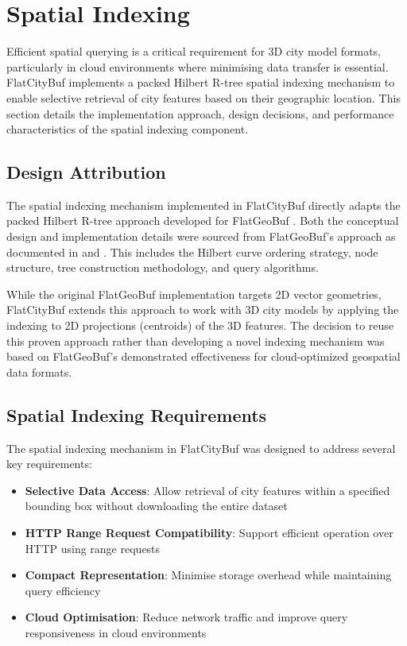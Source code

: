 
\section{Spatial Indexing}
\label{methodology:spatial_index}

Efficient spatial querying is a critical requirement for 3D city model formats, particularly in cloud environments where minimising data transfer is essential. FlatCityBuf implements a packed Hilbert R-tree spatial indexing mechanism \citep{Roussopoulos_Leifker_1985} to enable selective retrieval of city features based on their geographic location. This section details the implementation approach, design decisions, and performance characteristics of the spatial indexing component.

\subsection{Design Attribution}
\label{methodology:spatial_index:attribution}

The spatial indexing mechanism implemented in FlatCityBuf directly adapts the packed Hilbert R-tree approach developed for FlatGeoBuf \citep{flatgeobuf_spatial_index}. Both the conceptual design and implementation details were sourced from FlatGeoBuf's approach as documented in \citet{horance_2022} and \citet{}. This includes the Hilbert curve ordering strategy, node structure, tree construction methodology, and query algorithms.

While the original FlatGeoBuf implementation targets 2D vector geometries, FlatCityBuf extends this approach to work with 3D city models by applying the indexing to 2D projections (centroids) of the 3D features. The decision to reuse this proven approach rather than developing a novel indexing mechanism was based on FlatGeoBuf's demonstrated effectiveness for cloud-optimized geospatial data formats.

\subsection{Spatial Indexing Requirements}
\label{methodology:spatial_index:requirements}

The spatial indexing mechanism in FlatCityBuf was designed to address several key requirements:

\begin{itemize}
    \item \textbf{Selective Data Access}: Allow retrieval of city features within a specified bounding box without downloading the entire dataset
    \item \textbf{HTTP Range Request Compatibility}: Support efficient operation over HTTP using range requests
    \item \textbf{Compact Representation}: Minimise storage overhead while maintaining query efficiency
    \item \textbf{Cloud Optimisation}: Reduce network traffic and improve query responsiveness in cloud environments
\end{itemize}

